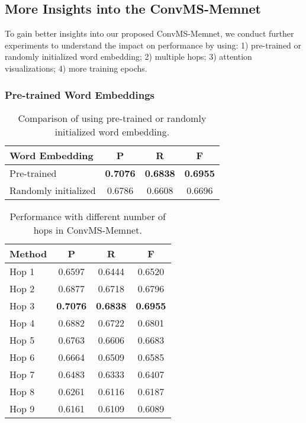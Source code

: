 \documentclass[11pt,letterpaper]{article}
\begin{document}
\begin{CJK*}{UTF8}{gbsn}
\subsection{More Insights into the ConvMS-Memnet}

To gain better insights into our proposed ConvMS-Memnet, we conduct further experiments to understand the impact on performance by using: 1) pre-trained or randomly initialized word embedding; 2) multiple hops; 3) attention visualizations; 4) more training epochs.



\subsubsection{Pre-trained Word Embeddings}

\begin{table}
\centering
\small
\begin{tabular}{|l|c|c|c|}
\hline
{\bf Word Embedding} & {\bf P} & {\bf R} & {\bf F}\\\hline
Pre-trained & \bf 0.7076 &	\bf0.6838	&\bf0.6955\\
Randomly initialized  & 0.6786	&0.6608	&0.6696\\ \hline
\end{tabular} 
\caption{Comparison of using pre-trained or randomly initialized word embedding.}
\end{table}

\begin{table}
\centering
\small
\begin{tabular}{|l|c|c|c|}
\hline
{\bf Method} & {\bf P} & {\bf R} & {\bf F}\\\hline
Hop 1 & 0.6597&	0.6444&	0.6520\\
Hop 2  & 0.6877	&0.6718	&0.6796\\
Hop 3 & \bf 0.7076 &	\bf0.6838	&\bf0.6955\\ 
Hop 4 & 0.6882	&0.6722&	0.6801\\ 
Hop 5 &0.6763	&0.6606&	0.6683\\
Hop 6 & 0.6664&	0.6509&	0.6585\\ 
Hop 7  & 0.6483	&0.6333	&0.6407\\ 
Hop 8  & 0.6261&	0.6116&	0.6187\\
Hop 9 &  0.6161 &	0.6109	&0.6089\\ \hline
\end{tabular} 
\caption{Performance with different number of hops in ConvMS-Memnet.}
\end{table}


\end{CJK*}
\end{document}
